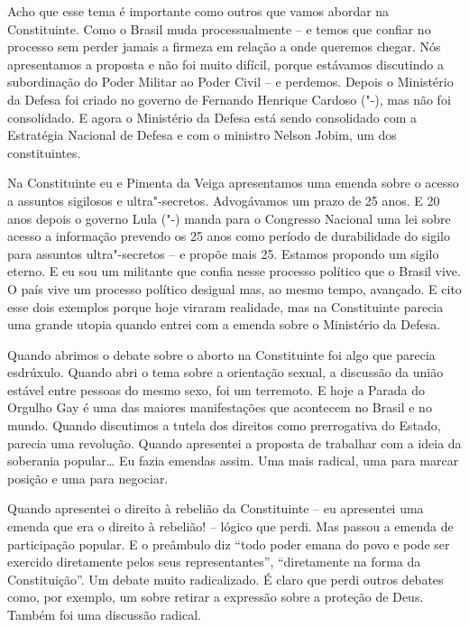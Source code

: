 Acho que esse tema é importante como outros que vamos
abordar na Constituinte. Como o Brasil muda processualmente -- e temos
que confiar no processo sem perder jamais a firmeza em relação a onde
queremos chegar. Nós apresentamos a proposta e não foi muito difícil,
porque estávamos discutindo a subordinação do Poder Militar ao Poder
Civil -- e perdemos. Depois o Ministério da Defesa foi criado no governo
de Fernando Henrique Cardoso ("-), mas não foi consolidado. E agora
o Ministério da Defesa está sendo consolidado com a Estratégia Nacional
de Defesa e com o ministro Nelson Jobim, um dos constituintes.

Na Constituinte eu e Pimenta da Veiga apresentamos uma emenda sobre o
acesso a assuntos sigilosos e ultra"-secretos. Advogávamos um prazo de 25
anos. E 20 anos depois o governo Lula ("-) manda para o Congresso
Nacional uma lei sobre acesso a informação prevendo os 25 anos como
período de durabilidade do sigilo para assuntos ultra"-secretos -- e
propõe mais 25. Estamos propondo um sigilo eterno. E eu sou um militante
que confia nesse processo político que o Brasil vive. O país vive um
processo político desigual mas, ao mesmo tempo, avançado. E cito esse
dois exemplos porque hoje viraram realidade, mas na Constituinte parecia
uma grande utopia quando entrei com a emenda sobre o Ministério da
Defesa.

Quando abrimos o debate sobre o aborto na Constituinte foi algo que
parecia esdrúxulo. Quando abri o tema sobre a orientação sexual, a
discussão da união estável entre pessoas do mesmo sexo, foi um
terremoto. E hoje a Parada do Orgulho Gay é uma das maiores
manifestações que acontecem no Brasil e no mundo. Quando discutimos a
tutela dos direitos como prerrogativa do Estado, parecia uma revolução.
Quando apresentei a proposta de trabalhar com a ideia da soberania
popular\ldots{} Eu fazia emendas assim. Uma mais radical, uma para marcar
posição e uma para negociar.

Quando apresentei o direito à rebelião da Constituinte -- eu apresentei
uma emenda que era o direito à rebelião! -- lógico que perdi. Mas passou
a emenda de participação popular. E o preâmbulo diz ``todo poder emana
do povo e pode ser exercido diretamente pelos seus representantes'',
``diretamente na forma da Constituição''. Um debate muito radicalizado.
É claro que perdi outros debates como, por exemplo, um sobre retirar a
expressão sobre a proteção de Deus. Também foi uma discussão radical.

